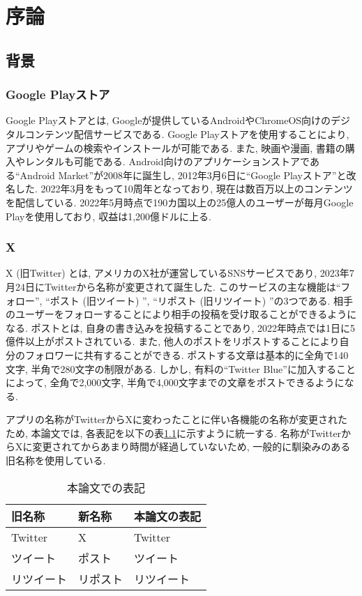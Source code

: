 \chapter{序論}
\label{chap:jyoron}

\section{背景}

\subsection{Google Playストア}
Google Playストア\cite{google-play-store}とは, Googleが提供しているAndroidやChromeOS向けのデジタルコンテンツ配信サービスである. Google Playストアを使用することにより, アプリやゲームの検索やインストールが可能である. また, 映画や漫画, 書籍の購入やレンタルも可能である. 
Android向けのアプリケーションストアである``Android Market''が2008年に誕生し, 2012年3月6日に``Google Playストア''と改名した. 2022年3月をもって10周年となっており, 現在は数百万以上のコンテンツを配信している\cite{about-google-play}. 
2022年5月時点で190カ国以上の25億人のユーザーが毎月Google Playを使用しており, 収益は1,200億ドルに上る\cite{purnima-kochikar}. 

\subsection{X}
X (旧Twitter) \cite{twitter}とは, アメリカのX社が運営しているSNSサービスであり, 2023年7月24日にTwitterから名称が変更されて誕生した. 
このサービスの主な機能は``フォロー'', ``ポスト (旧ツイート) '', ``リポスト (旧リツイート) ''の3つである. 相手のユーザーをフォローすることにより相手の投稿を受け取ることができるようになる. ポストとは, 自身の書き込みを投稿することであり, 2022年時点では1日に5億件以上がポストされている\cite{aboutx}. また, 他人のポストをリポストすることにより自分のフォロワーに共有することができる. 
ポストする文章は基本的に全角で140文字, 半角で280文字の制限がある. しかし, 有料の``Twitter Blue''に加入することによって, 全角で2,000文字, 半角で4,000文字までの文章をポストできるようになる. 

アプリの名称がTwitterからXに変わったことに伴い各機能の名称が変更されたため, 本論文では, 各表記を以下の表\ref{tb:twitter}に示すように統一する. 名称がTwitterからXに変更されてからあまり時間が経過していないため, 一般的に馴染みのある旧名称を使用している. 

\begin{table}[H]
  \caption{本論文での表記}
  \label{tb:twitter}
  \begin{center}
  \begin{tabularx}{\linewidth}{X|X|X}
    \hline
    旧名称&新名称&本論文の表記\\\hline\hline
    Twitter&X&Twitter\\\hline
    ツイート&ポスト&ツイート\\\hline
    リツイート&リポスト&リツイート\\\hline
  \end{tabularx}\end{center}
\end{table}


